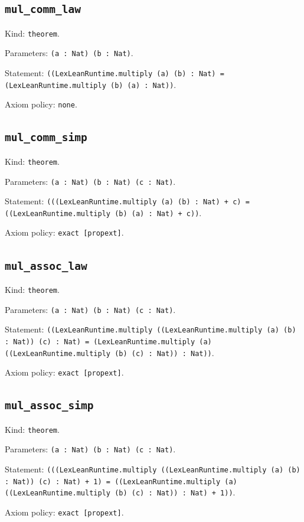 \documentclass[11pt]{article}
\begin{document}
\subsection*{\texttt{mul\_comm\_law}}
\noindent Kind: \texttt{theorem}.\par
\noindent Parameters: \texttt{(a : Nat) (b : Nat)}.\par
\noindent Statement: \texttt{((LexLeanRuntime.multiply (a) (b) : Nat) = (LexLeanRuntime.multiply (b) (a) : Nat))}.\par
\noindent Axiom policy: \texttt{none}.\par
\subsection*{\texttt{mul\_comm\_simp}}
\noindent Kind: \texttt{theorem}.\par
\noindent Parameters: \texttt{(a : Nat) (b : Nat) (c : Nat)}.\par
\noindent Statement: \texttt{(((LexLeanRuntime.multiply (a) (b) : Nat) + c) = ((LexLeanRuntime.multiply (b) (a) : Nat) + c))}.\par
\noindent Axiom policy: \texttt{exact [propext]}.\par
\subsection*{\texttt{mul\_assoc\_law}}
\noindent Kind: \texttt{theorem}.\par
\noindent Parameters: \texttt{(a : Nat) (b : Nat) (c : Nat)}.\par
\noindent Statement: \texttt{((LexLeanRuntime.multiply ((LexLeanRuntime.multiply (a) (b) : Nat)) (c) : Nat) = (LexLeanRuntime.multiply (a) ((LexLeanRuntime.multiply (b) (c) : Nat)) : Nat))}.\par
\noindent Axiom policy: \texttt{exact [propext]}.\par
\subsection*{\texttt{mul\_assoc\_simp}}
\noindent Kind: \texttt{theorem}.\par
\noindent Parameters: \texttt{(a : Nat) (b : Nat) (c : Nat)}.\par
\noindent Statement: \texttt{(((LexLeanRuntime.multiply ((LexLeanRuntime.multiply (a) (b) : Nat)) (c) : Nat) + 1) = ((LexLeanRuntime.multiply (a) ((LexLeanRuntime.multiply (b) (c) : Nat)) : Nat) + 1))}.\par
\noindent Axiom policy: \texttt{exact [propext]}.\par
\end{document}
